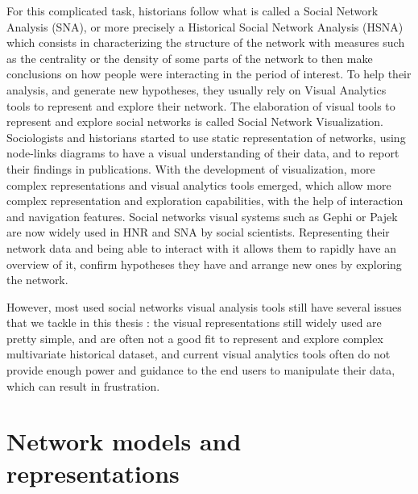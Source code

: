 For this complicated task, historians follow what is called a Social Network Analysis (SNA), or more precisely a Historical Social Network Analysis (HSNA) which consists in characterizing the structure of the network with measures such as the centrality or the density of some parts of the network to then make conclusions on how people were interacting in the period of interest. To help their analysis, and generate new hypotheses, they usually rely on Visual Analytics tools to represent and explore their network. The elaboration of visual tools to represent and explore social networks is called Social Network Visualization.
Sociologists and historians started to use static representation of networks, using node-links diagrams to have a visual understanding of their data, and to report their findings in publications. With the development of visualization, more complex representations and visual analytics tools emerged, which allow more complex representation and exploration capabilities, with the help of interaction and navigation features. Social networks visual systems such as Gephi or Pajek are now widely used in HNR and SNA by social scientists. Representing their network data and being able to interact with it allows them to rapidly have an overview of it, confirm hypotheses they have and arrange new ones by exploring the network.

However, most used social networks visual analysis tools still have several issues that we tackle in this thesis : the visual representations still widely used are pretty simple, and are often not a good fit to represent and explore complex multivariate historical dataset, and current visual analytics tools often do not provide enough power and guidance to the end users to manipulate their data, which can result in frustration.

\section{Network models and representations}

